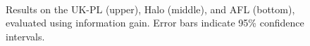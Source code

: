 %
\begin{center}
\begin{figure}[htbp!]
 \centering
 \\
\\
\\
\caption{\small Results on the UK-PL (upper), Halo (middle), and AFL (bottom), evaluated
using information gain. Error bars indicate
95\% confidence intervals.}
\label{fig:InforGain}
\end{figure}
\end{center}

%
%


